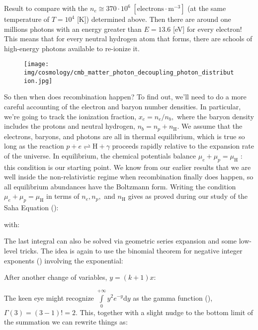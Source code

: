 	Result to compare with the $n_{e} \cong 370\cdot 10^{6}\;[\text{electrons}\cdot \text{m}^{-3}]$ (at the same temperature of  $T=10^{4}$ [K]) determined above. Then there are around one millions photons with an energy greater than $E=13.6$ [eV] for every electron! This means that for every neutral hydrogen atom that forms, there are schools of high-energy photons available to re-ionize it.
	\begin{figure}[H]
		\centering
		\texttt{[image: img/cosmology/cmb\_matter\_photon\_decoupling\_photon\_distribution.jpg]}
	\end{figure}
	 So then when does recombination happen? To find out, we'll need to do a more careful accounting of the electron and baryon number densities. In particular, we're going to track the ionization fraction, $x_{e}=n_{e} / n_{b},$ where the baryon density includes the protons and neutral hydrogen, $n_{b}=n_{p}+n_{\mathrm{H}}$. We assume that the electrons, baryons, and photons are all in thermal equilibrium, which is true so long as the reaction $p+e \rightleftharpoons \mathrm{H}+\gamma$ proceeds rapidly relative to the expansion rate of the universe. In equilibrium, the chemical potentials balance $\mu_{e}+\mu_{p}=\mu_{\mathrm{H}}$ : this condition is our starting point. We know from our earlier results that we are well inside the non-relativistic regime when recombination finally does happen, so all equilibrium abundances have the Boltzmann form. Writing the condition $\mu_{e}+\mu_{p}=\mu_\mathrm{H}$ in terms of $n_{e}, n_{p},$ and $n_\mathrm{H}$ gives as proved during our study of the Saha Equation ():
	
	with:
	
	The last integral can also be solved via geometric series expansion and some low-level tricks. The idea is again to use the binomial theorem for negative integer exponents () involving the exponential:
	
	After another change of variables, $y=(k+1)x$:
	
	The keen eye might recognize $\int\limits_0^{+\infty} y^2e^{-y}\mathrm{d}y$ as the gamma function (), $\Gamma(3)=(3-1)!=2$. This, together with a slight nudge to the bottom limit of the summation we can rewrite things as:
	
